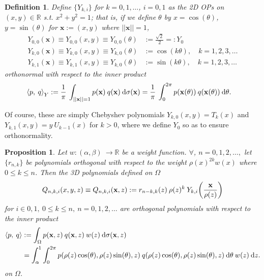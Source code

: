 \documentclass[11pt, oneside]{article}   	%
\newcommand{\R}{\mathbb{R}}
\newcommand{\scop}{Q}
\newcommand{\scopnki}{\scop_{n,k,i}}
\newcommand{\xvec}{\mathbf{x}}
\newcommand{\ch}{Y}
\newcommand{\chki}{\ch_{k,i}}
\newtheorem{proposition}{Proposition}
\newtheorem{definition}{Definition}
\begin{document}
\begin{definition}
Define $\{\chki\}$ for $k = 0, 1, \dots$, $i = 0, 1$ as the 2D OPs on $(x,y)\in\R$ s.t. $x^2 + y^2 = 1$; that is, if we define $\theta$ by $x = \cos(\theta)$, $y = \sin(\theta)$ for $\xvec := (x, y)$ where $||\xvec|| = 1$,
\begin{align}
	\ch_{0,0}(\xvec) \equiv \ch_{0,0}(x, y) \equiv \ch_{0,0}(\theta) &:= \frac{\sqrt{2}}{2} =: \ch_{0} \nonumber \\
	\ch_{k,0}(\xvec) \equiv \ch_{k,0}(x, y) \equiv \ch_{k,0}(\theta) &:= \cos(k \theta), \quad k = 1,2,3,\dots\label{eqn:circularharmonics} \\
	\ch_{k,1}(\xvec) \equiv \ch_{k,1}(x, y) \equiv \ch_{k,0}(\theta)& := \sin(k \theta), \quad k = 1,2,3,\dots \nonumber
\end{align}
orthonormal with respect to the inner product
\begin{align}
	\ip< p, \: q >_{\ch} &:= \frac{1}{\pi} \: \int_{||\xvec|| = 1} p(\xvec) \: q(\xvec) \: \D \sigma(\xvec) = \frac{1}{\pi} \: \int_0^{2\pi} p(\xvec(\theta)) \: q(\xvec(\theta)) \: \D \theta. \label{eqn:ipcircularharmonics}
\end{align}
\end{definition}
Of course, these are simply Chebyshev polynomials $\ch_{k,0}(x, y) = T_k(x)$ and $\ch_{k,1}(x, y) = y \: U_{k-1}(x)$ for $k > 0$, where we define $\ch_0$ so as to ensure orthonormality. 

\begin{proposition}\label{prop:construction}
Let $w : (\alpha,\beta) \: \to \R$ be a weight function. $\forall$, $n = 0,1,2,\dots, $ let $\{r_{n,k}\}$ be polynomials orthogonal with respect to the weight $\rho(x)^{2k} w(x)$ where $0 \le k \le n$. Then the 3D polynomials defined on $\Omega$
\begin{align*}
	\scopnki(x,y,z) \equiv \scopnki(\xvec,z) := r_{n-k,k}(z) \: \rho(z)^k \: \ch_{k,i}\fpr(\frac{\xvec}{\rho(z)})
\end{align*}
for $i \in {0,1}, \: 0 \le k \le n, \: n = 0,1,2,\dots$ are orthogonal polynomials with respect to the inner product
\begin{align*}
	\ip< p, \: q > &:= \int_\Omega p(\xvec, z) \: q(\xvec, z) \: w(z) \: \D \sigma(\xvec, z) \\
	&= \int_\alpha^1 \int_0^{2\pi} p(\rho(z) \cos(\theta), \rho(z) \sin(\theta), z) \: q(\rho(z) \cos(\theta), \rho(z) \sin(\theta), z) \: \D \theta \: w(z) \: \D z.
\end{align*}
on $\Omega$. 
\end{proposition}
\end{document}
